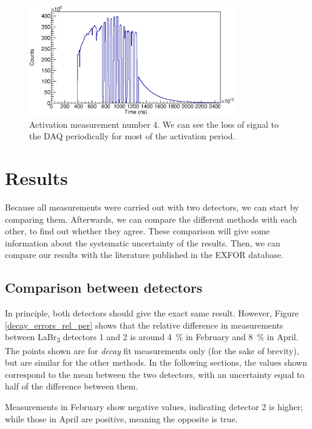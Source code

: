 \documentclass[a4paper,12pt]{report}
\begin{document}
\begin{figure}[H]
	\centering
	\includegraphics[width=0.80\textwidth]{activation_4_time.eps}
	\caption{Activation measurement number 4.
	We can see the loss of signal to the DAQ periodically for most of the activation period.}
	\label{activation_4_time}
\end{figure}

\section{Results}
Because all measurements were carried out with two detectors, we can start by comparing them.
Afterwards, we can compare the different methods with each other, to find out whether they agree.
These comparison will give some information about the systematic uncertainty of the results.
Then, we can compare our results with the literature published in the EXFOR database.\cite{jacobs}

\subsection{Comparison between detectors}
In principle, both detectors should give the exact same result.
However, Figure \ref{decay_errors_rel_per} shows that the relative difference in measurements between LaBr\textsubscript{3} detectors 1 and 2 is around \qty{4}{\percent} in February and \qty{8}{\percent} in April.
The points shown are for \textit{decay} fit measurements only (for the sake of brevity), but are similar for the other methods.
In the following sections, the values shown correspond to the mean between the two detectors, with an uncertainty equal to half of the difference between them.

Measurements in February show negative values, indicating detector 2 is higher; while those in April are positive, meaning the opposite is true.
\\
\end{document}
